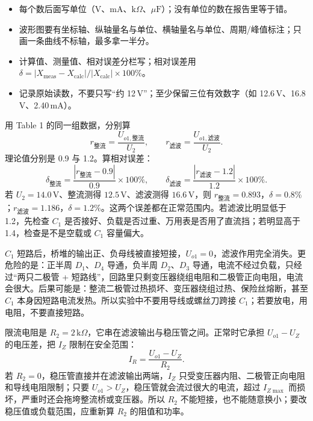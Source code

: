 \documentclass[11pt]{ctexart}
\let\orighdr\hdr
\renewcommand{\hdr}[2]{\needspace{12\baselineskip}\orighdr{#1}{#2}}
\let\origsubhdr\subhdr
\renewcommand{\subhdr}[1]{\needspace{3\baselineskip}\origsubhdr{#1}}
\begin{document}

\begin{itemize}
  \item 每个数后面写单位（V、mA、$\mathrm{k}\Omega$、$\mu\mathrm{F}$）；没有单位的数在报告里等于错。
  \item 波形图要有坐标轴、纵轴量名与单位、横轴量名与单位、周期/峰值标注；只画一条曲线不标轴，最多拿一半分。
  \item 计算值、测量值、相对误差分栏写；相对误差用 $\delta=|X_{\mathrm{meas}}-X_{\mathrm{calc}}|/|X_{\mathrm{calc}}|\times100\%$。
  \item 记录原始读数，不要只写“约 12\,V”；至少保留三位有效数字（如 12.6\,V、16.8\,V、2.40\,mA）。
\end{itemize}



用 Table 1 的同一组数据，分别算
\[
r_{\text{整流}}=\frac{U_{o1,\text{整流}}}{U_2},\qquad
r_{\text{滤波}}=\frac{U_{o1,\text{滤波}}}{U_2}.
\]
理论值分别是 0.9 与 1.2。算相对误差：
\[
\delta_{\text{整流}}=\frac{|r_{\text{整流}}-0.9|}{0.9}\times100\%,\qquad
\delta_{\text{滤波}}=\frac{|r_{\text{滤波}}-1.2|}{1.2}\times100\%.
\]
若 $U_2=14.0\,\mathrm{V}$、整流测得 $12.5\,\mathrm{V}$、滤波测得 $16.6\,\mathrm{V}$，则 $r_{\text{整流}}=0.893$，$\delta=0.8\%$；$r_{\text{滤波}}=1.186$，$\delta=1.2\%$。这两个误差都在正常范围内。若滤波比明显低于 1.2，先检查 $C_1$ 是否接好、负载是否过重、万用表是否用了直流挡；若明显高于 1.4，检查是不是空载或 $C_1$ 容量偏大。


$C_1$ 短路后，桥堆的输出正、负母线被直接短接，$U_{o1}=0$，滤波作用完全消失。更危险的是：正半周 $D_1$、$D_4$ 导通，负半周 $D_2$、$D_3$ 导通，电流不经过负载，只经过“两只二极管 + 短路线”，回路里只剩变压器绕组电阻和二极管正向电阻，电流会很大。后果可能是：整流二极管过热损坏、变压器绕组过热、保险丝熔断，甚至 $C_1$ 本身因短路电流发热。所以实验中不要用导线或螺丝刀跨接 $C_1$；若要放电，用电阻，不要直接短路。


限流电阻是 $R_2=2\,\mathrm{k}\Omega$，它串在滤波输出与稳压管之间。正常时它承担 $U_{o1}-U_Z$ 的电压差，把 $I_Z$ 限制在安全范围：
\[
I_R=\frac{U_{o1}-U_Z}{R_2}.
\]
若 $R_2=0$，稳压管直接并在滤波输出两端，$I_Z$ 只受变压器内阻、二极管正向电阻和导线电阻限制；只要 $U_{o1}>U_Z$，稳压管就会流过很大的电流，超过 $I_{Z\max}$ 而损坏，严重时还会拖垮整流桥或变压器。所以 $R_2$ 不能短接，也不能随意换小；要改稳压值或负载范围，应重新算 $R_2$ 的阻值和功率。
\end{document}
